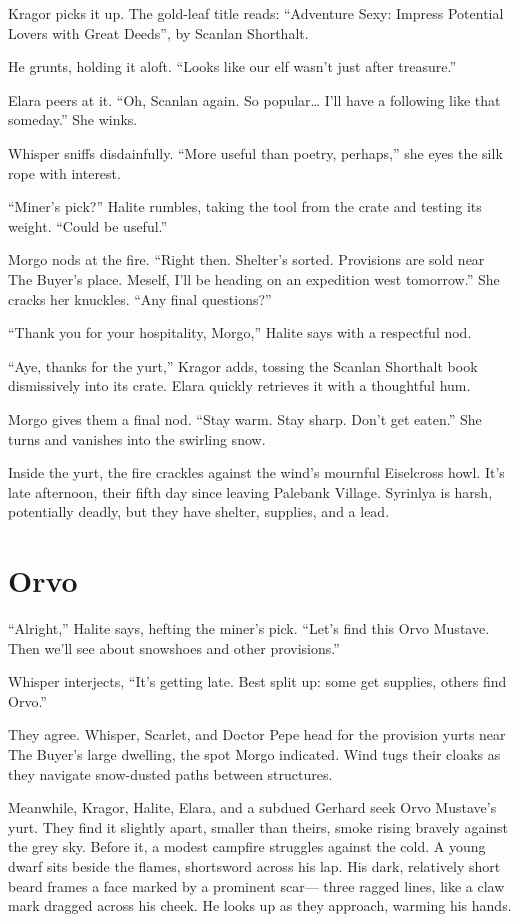 \documentclass[
  letterpaper,12pt,twoside,twocolumn,openany,
  nodeprecatedcode,bg=full]{dndbook}
\begin{document}
Kragor picks it up. The gold-leaf title reads: ``Adventure Sexy: Impress
Potential Lovers with Great Deeds'', by Scanlan Shorthalt.

He grunts, holding it aloft. ``Looks like our elf wasn't just after
treasure.''

Elara peers at it. ``Oh, Scanlan again. So popular\ldots{} I'll have a
following like that someday.'' She winks.

Whisper sniffs disdainfully. ``More useful than poetry, perhaps,'' she
eyes the silk rope with interest.

``Miner's pick?'' Halite rumbles, taking the tool from the crate and
testing its weight. ``Could be useful.''

Morgo nods at the fire. ``Right then. Shelter's sorted. Provisions are
sold near The Buyer's place. Meself, I'll be heading on an expedition
west tomorrow.'' She cracks her knuckles. ``Any final questions?''

``Thank you for your hospitality, Morgo,'' Halite says with a respectful
nod.

``Aye, thanks for the yurt,'' Kragor adds, tossing the Scanlan Shorthalt
book dismissively into its crate. Elara quickly retrieves it with a
thoughtful hum.

Morgo gives them a final nod. ``Stay warm. Stay sharp. Don't get
eaten.'' She turns and vanishes into the swirling snow.

Inside the yurt, the fire crackles against the wind's mournful
Eiselcross howl. It's late afternoon, their fifth day since leaving
Palebank Village. Syrinlya is harsh, potentially deadly, but they have
shelter, supplies, and a lead.

\section{Orvo}\label{orvo}

``Alright,'' Halite says, hefting the miner's pick. ``Let's find this
Orvo Mustave. Then we'll see about snowshoes and other provisions.''

Whisper interjects, ``It's getting late. Best split up: some get
supplies, others find Orvo.''

They agree. Whisper, Scarlet, and Doctor Pepe head for the provision
yurts near The Buyer's large dwelling, the spot Morgo indicated. Wind
tugs their cloaks as they navigate snow-dusted paths between structures.

Meanwhile, Kragor, Halite, Elara, and a subdued Gerhard seek Orvo
Mustave's yurt. They find it slightly apart, smaller than theirs, smoke
rising bravely against the grey sky. Before it, a modest campfire
struggles against the cold. A young dwarf sits beside the flames,
shortsword across his lap. His dark, relatively short beard frames a
face marked by a prominent scar--- three ragged lines, like a claw mark
dragged across his cheek. He looks up as they approach, warming his
hands.
\end{document}

